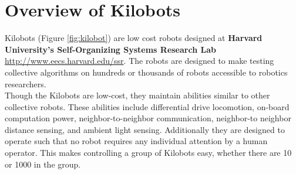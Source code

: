 
\chapter{Overview of Kilobots}

Kilobots (Figure \ref{fig:kilobot}) are low cost robots designed at \textbf{Harvard University's Self-Organizing Systems Research Lab} \url{http://www.eecs.harvard.edu/ssr}. The robots are designed to make testing collective algorithms on hundreds or thousands of robots accessible to robotics researchers.\\

Though the Kilobots are low-cost, they maintain abilities similar to other collective robots. These abilities include differential drive locomotion, on-board computation power, neighbor-to-neighbor communication, neighbor-to neighbor distance sensing, and ambient light sensing. Additionally they are designed to operate such that no robot requires any individual attention by a human operator. This makes controlling a group of Kilobots easy, whether there are 10 or 1000 in the group.
 
